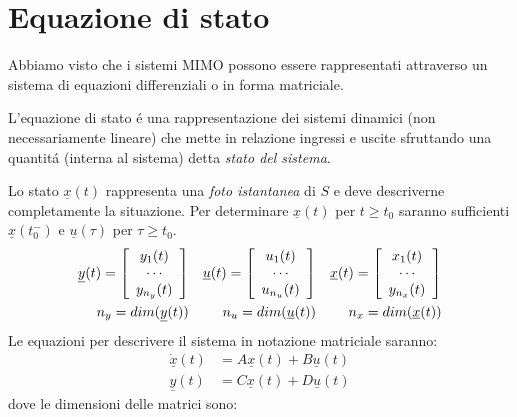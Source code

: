 \documentclass[../main.tex]{subfiles}
\begin{document}
	\section{Equazione di stato}
		Abbiamo visto che i sistemi MIMO possono essere rappresentati attraverso un sistema di equazioni differenziali o in forma matriciale.\\
		\begin{center}
			\begin{minipage}{.9\linewidth}
				L'equazione di stato \'e una rappresentazione dei sistemi dinamici (non necessariamente lineare) che mette in relazione ingressi e uscite sfruttando una quantit\'a (interna al sistema) detta \textit{stato del sistema}.\\
			\end{minipage}
		\end{center}
		Lo stato $ \underline{x}(t) $ rappresenta una \textit{foto istantanea} di $ S $ e deve descriverne completamente la situazione. Per determinare $ \underline{x}(t) $ per $ t \geq t_0 $ saranno sufficienti $ \underline{x}(t^-_0) $ e $ \underline u(\tau) $ per $ \tau \geq t_0 $.\\
		\begin{align*}
			\underline{y}(t) = \left[ \begin{array}{c}y_1(t)\\\cdots\\y_{n_y}(t)\end{array} \right]
			&&\underline{u}(t) = \left[ \begin{array}{c}u_1(t)\\\cdots\\u_{n_u}(t)\end{array} \right]
			&&\underline{x}(t) = \left[ \begin{array}{c}x_1(t)\\\cdots\\y_{n_x}(t)\end{array} \right]\\
			\medskip
			n_y = dim(\underline{y}(t)) &&n_u = dim(\underline{u}(t)) &&n_x = dim(\underline{x}(t))
		\end{align*}
		Le equazioni per descrivere il sistema in notazione matriciale saranno:
		\begin{align*}
			\underline{\dot{x}}(t) &= A \underline{x}(t) + B \underline{u}(t)\\
			\underline{y}(t) &= C \underline{x}(t) + D \underline{u}(t)
		\end{align*}
		dove le dimensioni delle matrici sono:
\end{document}
